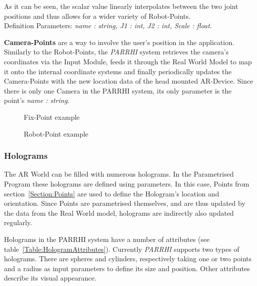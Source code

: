 As it can be seen, the scalar value linearly interpolates between the two joint positions and thus allows for a wider variety of Robot-Points.\\Definition Parameters: \textit{name : string, J1 : int, J2 : int, Scale : float}.

\textbf{Camera-Points} are a way to involve the user's position in the application. Similarly to the Robot-Points, the \textit{PARRHI} system retrieves the camera's coordinates via the Input Module, feeds it through the Real World Model to map it onto the internal coordinate systems and finally periodically updates the Camera-Points with the new location data of the head mounted AR-Device. Since there is only one Camera in the PARRHI system, its only parameter is the point's \textit{name : string}.


\begin{figure}[!h]
	\begin{minipage}{0.45\textwidth}
		\centering
		
		\caption{Fix-Point example}
		\label{InputData:PointFix}
	\end{minipage}\hfill
	\begin{minipage}{0.45\textwidth}
		\centering
		
		\caption{Robot-Point example}
		\label{InputData:PointRobot}
	\end{minipage}
\end{figure}

\subsubsection{Holograms}\label{Section:Holograms}
The AR World can be filled with numerous holograms. In the Parametrised Program these holograms are defined using parameters. In this case, Points from section~\ref{Section:Points} are used to define the Hologram's location and orientation. Since Points are parametrised themselves, and are thus updated by the data from the Real World model, holograms are indirectly also updated regularly.

Holograms in the PARRHI system have a number of attributes (see table~\ref{Table:HologramAttributes}). Currently \textit{PARRHI} supports two types of holograms. There are spheres and cylinders, respectively taking one or two points and a radius as input parameters to define its size and position. Other attributes describe its visual appearance.

